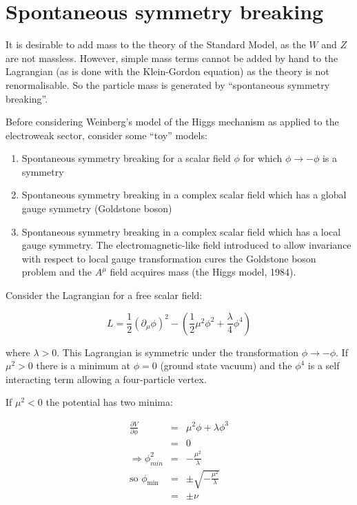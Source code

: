 \chapter{Spontaneous symmetry breaking}

It is desirable to add mass to the theory of the Standard Model, as the $W$ and $Z$ are not massless.  However, simple mass terms cannot be added by hand to the Lagrangian (as is done with the Klein-Gordon equation) as the theory is not renormalisable.  So the particle mass is generated by ``spontaneous symmetry breaking''.

Before considering Weinberg's model of the Higgs mechanism as applied to the electroweak sector, consider some ``toy'' models:

\begin{enumerate}
  \item Spontaneous symmetry breaking for a scalar field $\phi$ for which $\phi \to -\phi$ is a symmetry
  \item Spontaneous symmetry breaking in a complex scalar field which has a global gauge symmetry (Goldstone boson)
  \item Spontaneous symmetry breaking in a complex scalar field which has a local gauge symmetry.  The electromagnetic-like field introduced to allow invariance with respect to local gauge transformation cures the Goldstone boson problem and the $A^{\mu}$ field acquires mass (the Higgs model, 1984).
\end{enumerate}

Consider the Lagrangian for a free scalar field:

\[
  L = \frac{1}{2}\left(\partial_{\mu}\phi\right)^2 - \left(\frac{1}{2}\mu^2\phi^2 + \frac{\lambda}{4}\phi^4\right)
\]

where $\lambda>0$.  This Lagrangian is symmetric under the transformation $\phi \to -\phi$.  If $\mu^2>0$ there is a minimum at $\phi = 0$ (ground state vacuum) and the $\phi^4$ is a self interacting term allowing a four-particle vertex.

If $\mu^2<0$ the potential has two minima:

\begin{eqnarray*}
  \frac{\partial V}{\partial\phi} & = & \mu^2\phi + \lambda \phi^3 \\
  & = & 0 \\
  \Rightarrow \phi^2_{min} & = & -\frac{\mu^2}{\lambda} \\
  \textrm{so } \phi_{\min} & = & \pm\sqrt{-\frac{\mu^2}{\lambda}} \\
  & = & \pm \nu
\end{eqnarray*}

